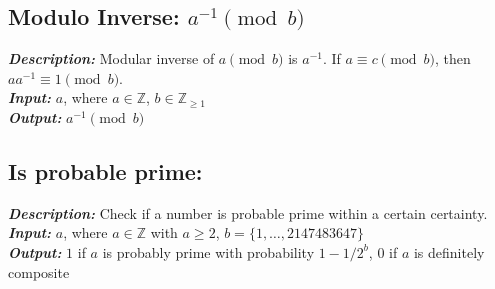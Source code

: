 \documentclass[12pt,oneside,a4paper]{article}
\begin{document}
\subsection*{Modulo Inverse: $a^{-1} \pmod b$}
\textbf{\emph{Description:}} Modular inverse of $a \pmod b$ is $a^{-1}$. If $a \equiv c \pmod{b}$, then $aa^{-1} \equiv 1 \pmod{b}$. \\
\textbf{\emph{Input:}} $a$, where $a \in \mathbb{Z}$, $b \in \mathbb{Z}_{\geq 1}$ \\
\textbf{\emph{Output:}} $a^{-1} \pmod b$

\subsection*{Is probable prime:}
\textbf{\emph{Description:}} Check if a number is probable prime within a certain certainty. \\
\textbf{\emph{Input:}} $a$, where $a \in \mathbb{Z}$ with $a \ge 2$, $b = \{1, \dots, 2147483647\}$ \\
\textbf{\emph{Output:}} $1$ if $a$ is probably prime with probability $1-1/2^b$, $0$ if $a$ is definitely composite
\end{document}
